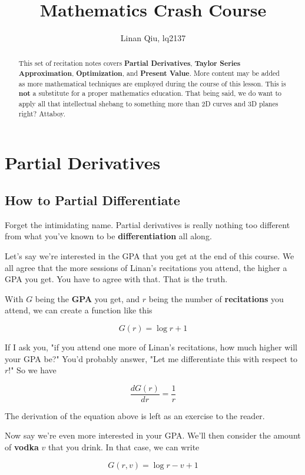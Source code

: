\documentclass[11pt]{scrartcl}
\title{Mathematics Crash Course}
\author{Linan Qiu, lq2137}
\begin{document}
\maketitle

\begin{abstract}
This set of recitation notes covers \textbf{Partial Derivatives}, \textbf{Taylor Series Approximation}, \textbf{Optimization}, and \textbf{Present Value}. More content may be added as more mathematical techniques are employed during the course of this lesson. This is \textbf{not} a substitute for a proper mathematics education. That being said, we do want to apply all that intellectual shebang to something more than 2D curves and 3D planes right? Attaboy.
\end{abstract}

\section{Partial Derivatives}

\subsection{How to Partial Differentiate}
Forget the intimidating name. Partial derivatives is really nothing too different from what you've known to be \textbf{differentiation} all along.

Let's say we're interested in the GPA that you get at the end of this course. We all agree that the more sessions of Linan's recitations you attend, the higher a GPA you get. You have to agree with that. That is the truth.

With $G$ being the \textbf{GPA} you get, and $r$ being the number of \textbf{recitations} you attend, we can create a function like this

\[G(r) = \log{r} + 1 \]

If I ask you, "if you attend one more of Linan's recitations, how much higher will your GPA be?" You'd probably answer, "Let me differentiate this with respect to $r$!" So we have

\[ \frac{d G(r)}{d r} = \frac{1}{r} \]

The derivation of the equation above is left as an exercise to the reader. 

Now say we're even more interested in your GPA. We'll then consider the amount of \textbf{vodka} $v$ that you drink. In that case, we can write

\[G(r, v) = \log{r} - v + 1\] 
\end{document}
